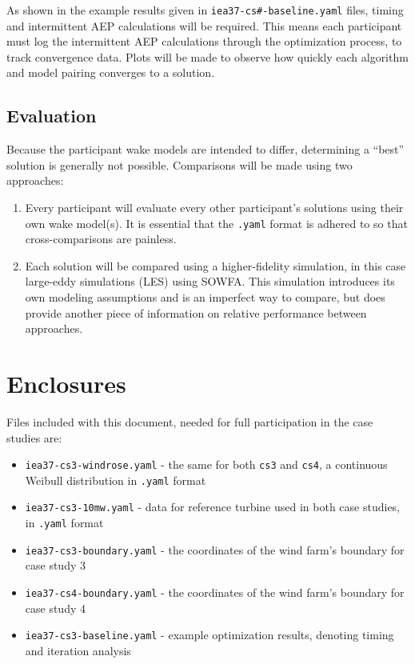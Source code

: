 \documentclass[10pt]{article}
\begin{document}
        As shown in the example results given in \texttt{iea37-cs\#-baseline.yaml} files, timing and intermittent AEP calculations will be required.
        This means each participant must log the intermittent AEP calculations through the optimization process, to track convergence data.
        Plots will be made to observe how quickly each algorithm and model pairing converges to a solution.
    
    \subsection{Evaluation}
        Because the participant wake models are intended to differ, determining a ``best'' solution is generally not possible.
        Comparisons will be made using two approaches:
        \begin{enumerate}
            \item Every participant will evaluate every other participant's solutions using their own wake model(s).  It is essential that the \texttt{.yaml} format is adhered to so that cross-comparisons are painless. %
            \item Each solution will be compared using a higher-fidelity simulation, in this case large-eddy simulations (LES) using SOWFA.  This simulation introduces its own modeling assumptions and is an imperfect way to compare, but does provide another piece of information on relative performance between approaches. %
        \end{enumerate}

\section{Enclosures}
    Files included with this document, needed for full participation in the case studies are:

    \begin{itemize}[noitemsep,topsep=0pt,parsep=0pt,partopsep=0pt]
        \item \texttt{iea37-cs3-windrose.yaml} - the same for both \texttt{cs3} and \texttt{cs4}, a continuous Weibull distribution in \texttt{.yaml} format
        \item \texttt{iea37-cs3-10mw.yaml} - data for reference turbine used in both case studies, in \texttt{.yaml} format
        \item \texttt{iea37-cs3-boundary.yaml} - the coordinates of the wind farm's boundary for case study 3
        \item \texttt{iea37-cs4-boundary.yaml} - the coordinates of the wind farm's boundary for case study 4
        \item \texttt{iea37-cs3-baseline.yaml} - example optimization results, denoting timing and iteration analysis
    \end{itemize}



\end{document}
